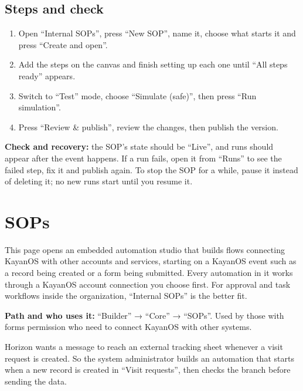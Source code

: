\subsection{Steps and check}
\begin{enumerate}
\item Open “Internal SOPs”, press “New SOP”, name it, choose what starts it and press “Create and open”.
\item Add the steps on the canvas and finish setting up each one until “All steps ready” appears.
\item Switch to “Test” mode, choose “Simulate (safe)”, then press “Run simulation”.
\item Press “Review \& publish”, review the changes, then publish the version.
\end{enumerate}

\textbf{Check and recovery:} the SOP's state should be “Live”, and runs should appear after the event happens. If a run fails, open it from “Runs” to see the failed step, fix it and publish again. To stop the SOP for a while, pause it instead of deleting it; no new runs start until you resume it.

\clearpage
\section{SOPs}
\label{sec:builder-feature-sops}

This page opens an embedded automation studio that builds flows connecting KayanOS with other accounts and services, starting on a KayanOS event such as a record being created or a form being submitted. Every automation in it works through a KayanOS account connection you choose first. For approval and task workflows inside the organization, “Internal SOPs” is the better fit.

\textbf{Path and who uses it:} “Builder” → “Core” → “SOPs”. Used by those with forms permission who need to connect KayanOS with other systems.

\begin{rcnote}
Horizon wants a message to reach an external tracking sheet whenever a visit request is created. So the system administrator builds an automation that starts when a new record is created in “Visit requests”, then checks the branch before sending the data.
\end{rcnote}

